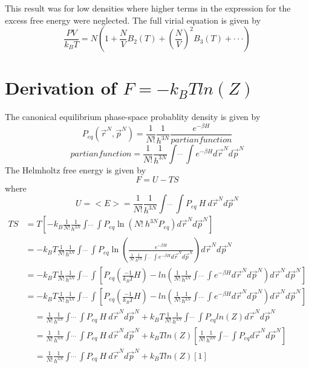 \documentclass[double,12pt]{beavtex}
\begin{document}
This result was for low densities where higher terms in the 
expression for the excess free energy were neglected. The full virial 
equation is given by
\begin{equation}\frac{PV}{k_BT}=N\left(1+\frac{N}{V}B_2(T)+\left(\frac{N}{V}\right)^2B_3(T)+ \cdot\cdot\cdot\right) \end{equation}


\section{Derivation of $F = -k_BTln(Z)$}
The canonical equilibrium phase-space probablity density is given by
\begin{equation}P_{eq}(\vec r^N, \vec p^N)=\frac{1}{N!}\frac{1}{h^{3N}}\frac{e^{-\beta H}}{partian function}\end{equation}
\begin{equation}{partian function}=\frac{1}{N!}\frac{1}{h^{3N}}\int\dot~\dot~\dot~\int e^{-\beta H} d\vec r^{N} d\vec p^{N}\end{equation}
The Helmholtz free energy is given by 
\begin{equation}\label{F=U-TS}F = U - TS\end{equation}
where
\begin{equation}U = <E> = \frac{1}{N!}\frac{1}{h^{3N}}\int\dot~\dot~\dot~\int P_{eq}~H~d\vec r^{N} d\vec p^{N}\end{equation}
\begin{align}
 TS &= T\left[-k_B\frac{1}{N!}\frac{1}{h^{3N}}\int\dot~\dot~\dot~\int P_{eq}\operatorname{ln}\left(N!~h^{3N}P_{eq}\right) d\vec r^{N} d\vec p^{N}\right]   \\
	&= -k_BT\frac{1}{N!}\frac{1}{h^{3N}}\int\dot~\dot~\dot~\int P_{eq}\operatorname{ln}\left(\frac{e^{-\beta H}}{\frac{1}{N!}\frac{1}{h^{3N}}\int\dot~\dot~\dot~\int e^{-\beta H} d\vec r^{N} d\vec p^{N}}\right) d\vec r^{N} d\vec p^{N}   \\
	&= -k_BT\frac{1}{N!}\frac{1}{h^{3N}}\int\dot~\dot~\dot~\int \left[P_{eq}\left(\frac{-1}{k_BT}H\right)-ln\left(\frac{1}{N!}\frac{1}{h^{3N}}\int\dot~\dot~\dot~\int e^{-\beta H} d\vec r^{N} d\vec p^{N}\right) d\vec r^{N} d\vec p^{N}\right]  \\ 
    &= -k_BT\frac{1}{N!}\frac{1}{h^{3N}}\int\dot~\dot~\dot~\int \left[P_{eq}\left(\frac{-1}{k_BT}H\right)-ln\left(\frac{1}{N!}\frac{1}{h^{3N}}\int\dot~\dot~\dot~\int e^{-\beta H} d\vec r^{N} d\vec p^{N}\right) d\vec r^{N} d\vec p^{N}\right]   
\end{align}  
\begin{align}  
    &= \frac{1}{N!}\frac{1}{h^{3N}}\int\dot~\dot~\dot~\int P_{eq}~H~d\vec r^{N} d\vec p^{N} +k_BT\frac{1}{N!}\frac{1}{h^{3N}}\int\dot~\dot~\dot~\int P_{eq}ln(Z)d\vec r^{N} d\vec p^{N}     \\
    &= \frac{1}{N!}\frac{1}{h^{3N}}\int\dot~\dot~\dot~\int P_{eq}~H~d\vec r^{N} d\vec p^{N} +k_BTln(Z)\left[\frac{1}{N!}\frac{1}{h^{3N}}\int\dot~\dot~\dot~\int P_{eq}d\vec r^{N} d\vec p^{N}\right]   \\
    &= \frac{1}{N!}\frac{1}{h^{3N}}\int\dot~\dot~\dot~\int P_{eq}~H~d\vec r^{N} d\vec p^{N} +k_BTln(Z)\left[1\right]   
\end{align}
\end{document}
